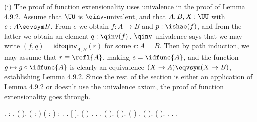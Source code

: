  \soln
(i)  The proof of function extensionality uses univalence in the proof of
Lemma 4.9.2.  Assume that $\UU$ is $\qinv$-univalent, and that $A, B, X : \UU$
with $e : A \eqvsym B$.  From $e$ we obtain $f : A \to B$ and $p :
\ishae(f)$, and from the latter we obtain an element $q : \qinv(f)$.
$\qinv$-univalence says that we may write $(f, q) = \mathsf{idtoqinv}_{A,
B}(r)$ for some $r : A = B$.  Then by path induction, we may assume that $r
\equiv \refl{A}$, making $e = \idfunc{A}$, and the function $g \mapsto g \circ
\idfunc{A}$ is clearly an equivalence $(X \to A) \eqvsym (X \to B)$,
establishing Lemma 4.9.2.  Since the rest of the section is either an
application of Lemma 4.9.2 or doesn't use the univalence axiom, the proof of
function extensionality goes through.
\begin{coqdoccode}
\coqdocemptyline
\coqdocnoindent
{} .\coqdoceol
\coqdocemptyline
\coqdocnoindent
{}  : \coqdockw{\ensuremath{\forall}}  ,  (  ).\coqdoceol
\coqdocemptyline
\coqdocnoindent
{}  (   : ) ( :  \coqdocnotation{\ensuremath{\eqvsym}} ) : \coqdocnotation{(}  \coqdocnotation{)} \coqdocnotation{\ensuremath{\eqvsym}} \coqdocnotation{(}  \coqdocnotation{)}.\coqdoceol
\coqdocnoindent
{}.\coqdoceol
\coqdocindent{1.00em}
   [ ].\coqdoceol
\coqdocindent{1.00em}
 ( )  . \coqdoctac{\ensuremath{\exists}} . .\coqdoceol
\coqdocindent{2.00em}
 ( ).  ( ).\coqdoceol
\coqdocindent{1.00em}
 ( \coqdocnotation{=} )  .  (  ).\coqdoceol
\coqdocindent{1.00em}
 ( \coqdocvar{\_} \coqdocvar{\_}  ).\coqdoceol
\coqdocindent{1.00em}
.  .\coqdoceol
\coqdocnoindent
{}.\coqdoceol
\coqdocemptyline
\end{coqdoccode}
